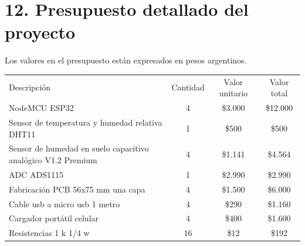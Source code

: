 \documentclass[
11pt, %
codirector, %
]{charter}
\begin{document}
\section{12. Presupuesto detallado del proyecto}
\label{sec:presupuesto}

Los valores en el presupuesto están expresados en pesos argentinos.

\begin{table}[htpb]
\centering
\begin{tabularx}{\linewidth}{@{}|X|c|r|r|@{}}
\hline
\rowcolor[HTML]{C0C0C0} 
\multicolumn{4}{|c|}{\cellcolor[HTML]{C0C0C0}COSTOS DIRECTOS} \\ \hline
\rowcolor[HTML]{C0C0C0} 
Descripción &
  \multicolumn{1}{c|}{\cellcolor[HTML]{C0C0C0}Cantidad} &
  \multicolumn{1}{c|}{\cellcolor[HTML]{C0C0C0}Valor unitario} &
  \multicolumn{1}{c|}{\cellcolor[HTML]{C0C0C0}Valor total} \\ \hline
  
 NodeMCU ESP32&
  \multicolumn{1}{c|}{4} &
  \multicolumn{1}{c|}{\$3.000} &
  \multicolumn{1}{c|}{\$12.000} \\ \hline

 Sensor de temperatura y humedad relativa DHT11&
  \multicolumn{1}{c|}{1} &
  \multicolumn{1}{c|}{\$500} &
  \multicolumn{1}{c|}{\$500} \\ \hline

 Sensor de humedad en suelo capacitivo analógico V1.2 Premium&
  \multicolumn{1}{c|}{4} &
  \multicolumn{1}{c|}{\$1.141} &
  \multicolumn{1}{c|}{\$4.564} \\ \hline

 ADC ADS1115&
  \multicolumn{1}{c|}{1} &
  \multicolumn{1}{c|}{\$2.990} &
  \multicolumn{1}{c|}{\$2.990} \\ \hline

 Fabricación PCB 56x75 mm una capa&
  \multicolumn{1}{c|}{4} &
  \multicolumn{1}{c|}{\$1.500} &
  \multicolumn{1}{c|}{\$6.000} \\ \hline

 Cable usb a micro usb 1 metro&
  \multicolumn{1}{c|}{4} &
  \multicolumn{1}{c|}{\$290} &
  \multicolumn{1}{c|}{\$1.160} \\ \hline

 Cargador portátil celular&
  \multicolumn{1}{c|}{4} &
  \multicolumn{1}{c|}{\$400} &
  \multicolumn{1}{c|}{\$1.600} \\ \hline

 Resistencias 1 k 1/4 w&
  \multicolumn{1}{c|}{16} &
  \multicolumn{1}{c|}{\$12} &
  \multicolumn{1}{c|}{\$192} \\ \hline


\end{tabularx}
\end{table}
\end{document}
